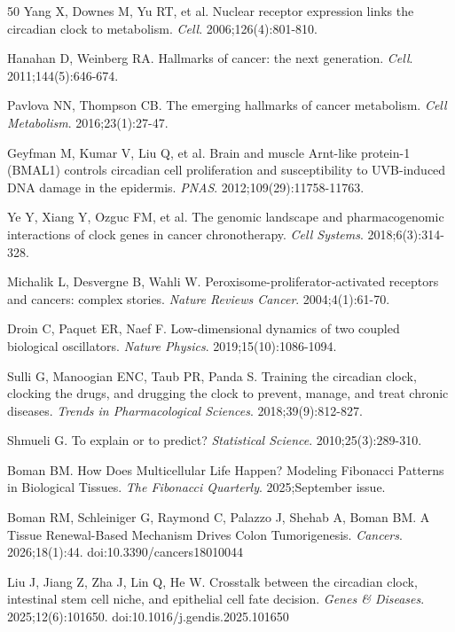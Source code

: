 \documentclass[11pt,a4paper]{article}
\begin{document}
\begin{thebibliography}{50}
Yang X, Downes M, Yu RT, et al.
Nuclear receptor expression links the circadian clock to metabolism.
\textit{Cell}. 2006;126(4):801-810.

Hanahan D, Weinberg RA.
Hallmarks of cancer: the next generation.
\textit{Cell}. 2011;144(5):646-674.

Pavlova NN, Thompson CB.
The emerging hallmarks of cancer metabolism.
\textit{Cell Metabolism}. 2016;23(1):27-47.

Geyfman M, Kumar V, Liu Q, et al.
Brain and muscle Arnt-like protein-1 (BMAL1) controls circadian cell proliferation and susceptibility to UVB-induced DNA damage in the epidermis.
\textit{PNAS}. 2012;109(29):11758-11763.

Ye Y, Xiang Y, Ozguc FM, et al.
The genomic landscape and pharmacogenomic interactions of clock genes in cancer chronotherapy.
\textit{Cell Systems}. 2018;6(3):314-328.

Michalik L, Desvergne B, Wahli W.
Peroxisome-proliferator-activated receptors and cancers: complex stories.
\textit{Nature Reviews Cancer}. 2004;4(1):61-70.

Droin C, Paquet ER, Naef F.
Low-dimensional dynamics of two coupled biological oscillators.
\textit{Nature Physics}. 2019;15(10):1086-1094.

Sulli G, Manoogian ENC, Taub PR, Panda S.
Training the circadian clock, clocking the drugs, and drugging the clock to prevent, manage, and treat chronic diseases.
\textit{Trends in Pharmacological Sciences}. 2018;39(9):812-827.

Shmueli G.
To explain or to predict?
\textit{Statistical Science}. 2010;25(3):289-310.

Boman BM.
How Does Multicellular Life Happen? Modeling Fibonacci Patterns in Biological Tissues.
\textit{The Fibonacci Quarterly}. 2025;September issue.

Boman RM, Schleiniger G, Raymond C, Palazzo J, Shehab A, Boman BM.
A Tissue Renewal-Based Mechanism Drives Colon Tumorigenesis.
\textit{Cancers}. 2026;18(1):44. doi:10.3390/cancers18010044

Liu J, Jiang Z, Zha J, Lin Q, He W.
Crosstalk between the circadian clock, intestinal stem cell niche, and epithelial cell fate decision.
\textit{Genes \& Diseases}. 2025;12(6):101650. doi:10.1016/j.gendis.2025.101650


\end{thebibliography}
\end{document}
